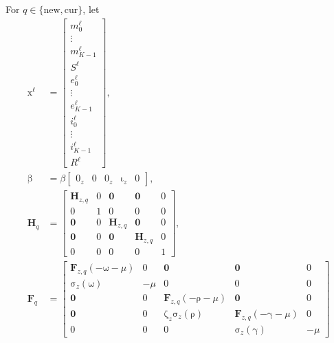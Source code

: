 \documentclass[USenglish]{article}
\renewcommand{\vec}[1]{\boldsymbol{\mathrm{#1}}}
\newcommand{\mat}[1]{\mathbf{#1}}
\begin{document}
For $q \in \{\mathrm{new}, \mathrm{cur}\}$, let
\begin{subequations}
  \begin{align}
    \vec{x}^{\ell} &=
    \begin{bmatrix}
      m_0^{\ell} \\ \vdots \\ m_{K - 1}^{\ell} \\
      S^{\ell} \\
      e_0^{\ell} \\ \vdots \\ e_{K - 1}^{\ell} \\
      i_0^{\ell} \\ \vdots \\ i_{K - 1}^{\ell} \\
      R^{\ell}
    \end{bmatrix},
    \\
    \vec{\beta} &=
    \beta
    \begin{bmatrix}
      \vec{0}_z & 0 & \vec{0}_z & \vec{\iota}_z & 0
    \end{bmatrix},
    \\
    \mat{H}_{q} &=
    \begin{bmatrix}
      \mat{H}_{z, q} & \vec{0} & \mat{0} & \mat{0} & \vec{0} \\
      \vec{0} & 1 & \vec{0} & \vec{0} & 0 \\
      \mat{0} & \vec{0} & \mat{H}_{z, q} & \mat{0} & \vec{0} \\
      \mat{0} & \vec{0} & \mat{0} & \mat{H}_{z, q} & \vec{0}
      \\
      \vec{0} & 0 & \vec{0} & \vec{0} & 1
    \end{bmatrix},
    \\
    \mat{F}_q &=
    \begin{bmatrix}
      \mat{F}_{z, q}(- \vec{\omega} - \mu) & \vec{0} & \mat{0}
      & \mat{0} & \vec{0}
      \\
      \vec{\sigma}_z(\vec{\omega}) & - \mu & \vec{0} & \vec{0} & 0
      \\
      \mat{0} & \vec{0} & \mat{F}_{z, q}(- \vec{\rho} - \mu)
      & \mat{0} & \vec{0}
      \\
      \mat{0} & \vec{0} & \vec{\zeta}_z \vec{\sigma}_z(\vec{\rho})
      & \mat{F}_{z, q}(- \vec{\gamma} - \mu) & \vec{0}
      \\
      \vec{0} & 0 & \vec{0} & \vec{\sigma}_z(\vec{\gamma}) & - \mu

\end{bmatrix}
\end{align}
\end{subequations}
\end{document}
